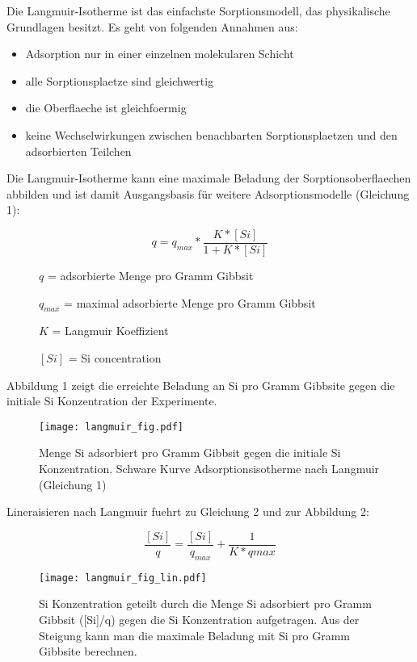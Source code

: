 Die Langmuir-Isotherme ist das einfachste Sorptionsmodell, das physikalische Grundlagen besitzt. 
Es geht von folgenden Annahmen aus:

\begin{itemize}
\item Adsorption nur in einer einzelnen molekularen Schicht
\item alle Sorptionsplaetze sind gleichwertig
\item die Oberflaeche ist gleichfoermig 
\item keine Wechselwirkungen zwischen benachbarten Sorptionsplaetzen und den adsorbierten Teilchen
\end{itemize}

Die Langmuir-Isotherme kann eine maximale Beladung der Sorptionsoberflaechen abbilden und ist damit Ausgangsbasis für weitere Adsorptionsmodelle (Gleichung 1):

\begin{equation}
q=q_{max}*\frac{K*[Si]}{1+K*[Si]}
\end{equation}

\begin{description}
\item[ ] $q$ = adsorbierte Menge pro Gramm Gibbsit
\item[ ] $q_{max}$ = maximal adsorbierte Menge pro Gramm Gibbsit
\item[ ]$K$ = Langmuir Koeffizient	
\item[ ]$[Si]$ = Si concentration
\end{description}

\bigskip

Abbildung 1 zeigt die erreichte Beladung an Si pro Gramm Gibbsite gegen die initiale Si Konzentration der Experimente.
\begin{figure}[htbp]
\begin{center}
\texttt{[image: langmuir\_fig.pdf]}
\caption{Menge Si adsorbiert pro Gramm Gibbsit gegen die initiale Si Konzentration. Schware Kurve Adsorptionsisotherme nach Langmuir (Gleichung 1)}
\label{default}
\end{center}
\end{figure}


Lineraisieren nach Langmuir fuehrt zu Gleichung 2 und zur Abbildung 2:

\begin{equation}
\frac{[Si]}{q}=\frac{[Si]}{q_{max}}+\frac{1}{K*q{max}}
\end{equation}

\begin{figure}[htbp]
\begin{center}
\texttt{[image: langmuir\_fig\_lin.pdf]}
\caption{Si Konzentration geteilt durch die Menge Si adsorbiert pro Gramm Gibbsit ([Si]/q) gegen die Si Konzentration aufgetragen. Aus der Steigung kann man die maximale Beladung mit Si pro Gramm Gibbsite berechnen. }
\label{default}
\end{center}
\end{figure}


